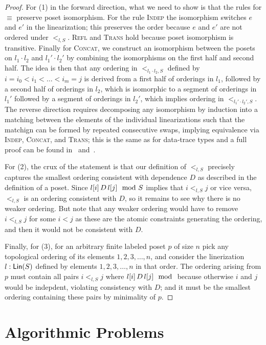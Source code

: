 \begin{proof}
For (1) in the forward direction, what we need to show is that the rules for $\equiv$ preserve poset isomorphism. For the rule \textsc{Indep} the isomorphism switches $e$ and $e'$ in the linearization; this preserves the order because $e$ and $e'$ are not ordered under $<_{l, S}$. \textsc{Refl} and \textsc{Trans} hold because poset isomorphism is transitive. Finally for \textsc{Concat}, we construct an isomorphism between the posets on $l_1 \cdot l_2$ and $l_1' \cdot l_2'$ by combining the isomorphisms on the first half and second half. The idea is then that any ordering in $<_{l_1 \cdot l_2, S}$ defined by $i = i_0 < i_1 < \ldots < i_m = j$ is derived from a first half of orderings in $l_1$, followed by a second half of orderings in $l_2$,
which is isomorphic to a segment of orderings in $l_1'$ followed by a segment of orderings in $l_2'$, which implies ordering in $<_{l_1' \cdot l_2', S}$.
The reverse direction requires decomposing any isomorphism by induction into a matching between the elements of the individual linearizations such that the matchign can be formed by repeated consecutive swaps, implying equivalence via \textsc{Indep}, \textsc{Concat}, and \textsc{Trans}; this is the same as for data-trace types and a full proof can be found in~\cite{pldi19} and~\cite{festschrift18}.

For (2), the crux of the statement is that our definition of $<_{l, S}$ precisely captures the smallest ordering consistent with dependence $D$ as described in the definition of a poset. Since $l[i] \,D\, l[j] \mod {S}$ implies that $i <_{l, S} j$ or vice versa, $<_{l, S}$ is an ordering consistent with $D$, so it remains to see why there is no weaker ordering. But note that any weaker ordering would have to remove $i <_{l, S} j$ for some $i < j$ as these are the atomic constraints generating the ordering, and then it would not be consistent with $D$.

Finally, for (3), for an arbitrary finite labeled poset $p$ of size $n$ pick any topological ordering of its elements $1, 2, 3, \ldots, n$, and consider the linerization $l: \mathsf{Lin}({S})$ defined by elements $1, 2, 3, \ldots, n$ in that order. The ordering arising from $p$ must contain all pairs $i <_{l, S} j$ where $\deptype{l[i]}{l[j]}$ because otherwise $i$ and $j$ would be indepdent, violating consistency with $D$; and it must be the smallest ordering containing these pairs by minimality of $p$.
\end{proof}

\section{Algorithmic Problems}

